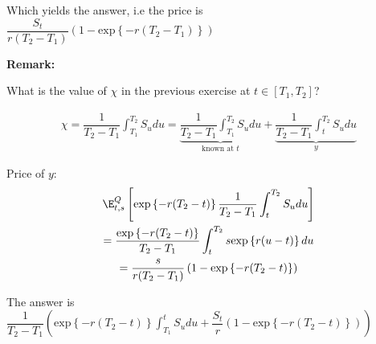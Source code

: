 \noindent Which yields the answer, i.e the price is $\dfrac{S_t}{r(T_2-T_1)}\left(1-\text{exp}\left\{-r(T_2-T_1)\right\}\right)$
\par\bigskip
\noindent\textbf{Remark:}\par
\noindent What is the value of $\chi$ in the previous exercise at $t \in[T_1,T_2]$?\par
\begin{equation*}
  \begin{gathered}
    \chi = \dfrac{1}{T_2-T_1}\int_{T_1}^{T_2}S_udu = \underbrace{\dfrac{1}{T_2-T_1}\int_{T_1}^{T_2}S_udu}_{\text{known at $t$}}+\underbrace{\dfrac{1}{T_2-T_1}\int_{t}^{T_2}S_udu}_{y}
  \end{gathered}
\end{equation*}
\par\bigskip
\noindent Price of $y$:
\begin{equation*}
  \begin{gathered}
    \E_{t,s}^Q\left[\text{exp}\left\{-r(T_2-t)\right\}\dfrac{1}{T_2-T_1}\int_{t}^{T_2}S_udu\right]\\
    =\dfrac{\text{exp}\left\{-r(T_2-t)\right\}}{T_2-T_1}\int_{t}^{T_2}s\text{exp}\left\{r(u-t)\right\}du\\
    = \dfrac{s}{r(T_2-T_1)}\left(1-\text{exp}\left\{-r(T_2-t)\right\}\right)
  \end{gathered}
\end{equation*}\par
\noindent The answer is $\dfrac{1}{T_2-T_1}\left(\text{exp}\left\{-r(T_2-t)\right\}\int_{T_1}^{t}S_udu+\dfrac{S_t}{r}\left(1-\text{exp}\left\{-r(T_2-t)\right\}\right)\right)$
\par\bigskip
